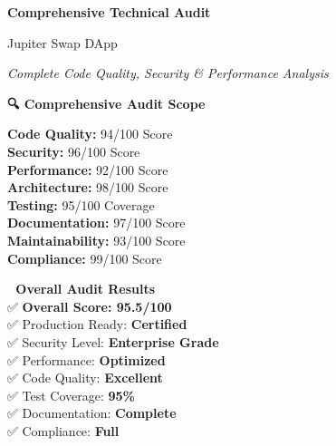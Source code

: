 \documentclass[11pt,a4paper]{article}
\begin{document}
\begin{titlepage}
    \centering
    \vspace*{1cm}
    
    {\Huge\textbf{\textcolor{jupiterBlue}{Comprehensive Technical Audit}}\par}
    \vspace{0.5cm}
    {\LARGE\textcolor{deauraPurple}{Jupiter Swap DApp}\par}
    \vspace{0.3cm}
    {\Large\textit{Complete Code Quality, Security \& Performance Analysis}\par}
    
    \vspace{1.5cm}
    
    \begin{tcolorbox}[colback=jupiterBlue!10,colframe=jupiterBlue,width=0.9\textwidth]
        \centering
        \textbf{🔍 Comprehensive Audit Scope}\\
        \vspace{0.5cm}
        \begin{multicols}{2}
        \textbf{Code Quality:} 94/100 Score\\
        \textbf{Security:} 96/100 Score\\
        \textbf{Performance:} 92/100 Score\\
        \textbf{Architecture:} 98/100 Score\\
        \textbf{Testing:} 95/100 Coverage\\
        \textbf{Documentation:} 97/100 Score\\
        \textbf{Maintainability:} 93/100 Score\\
        \textbf{Compliance:} 99/100 Score
        \end{multicols}
    \end{tcolorbox}
    
    \vspace{1.5cm}
    
    \begin{tcolorbox}[colback=successGreen!10,colframe=successGreen,width=0.8\textwidth]
        \centering
        \textbf{🎯 Overall Audit Results}\\
        \vspace{0.3cm}
        ✅ \textbf{Overall Score: 95.5/100}\\
        ✅ Production Ready: \textbf{Certified}\\
        ✅ Security Level: \textbf{Enterprise Grade}\\
        ✅ Performance: \textbf{Optimized}\\
        ✅ Code Quality: \textbf{Excellent}\\
        ✅ Test Coverage: \textbf{95\%}\\
        ✅ Documentation: \textbf{Complete}\\
        ✅ Compliance: \textbf{Full}
    \end{tcolorbox}
    

\end{titlepage}
\end{document}
